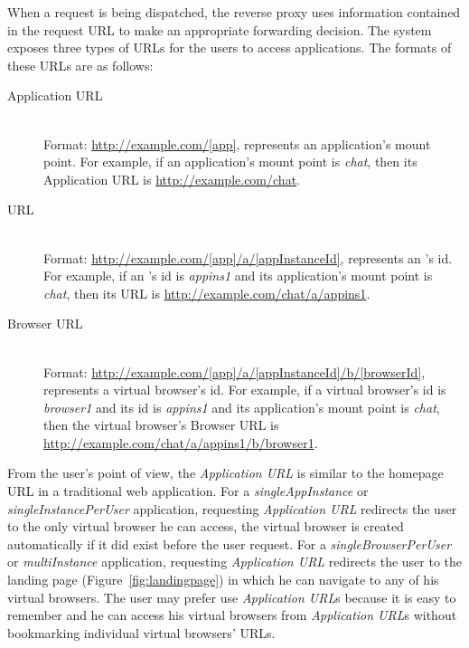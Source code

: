 When a request is being dispatched, the reverse proxy uses information
contained in the request URL to make an appropriate forwarding decision. 
The system exposes three types of URLs for the users to access \cb applications.
The formats of these URLs are as follows:

\begin{description}

\item[Application URL] \label{itm:appurl} \hfill \\
Format: \url{http://example.com/[app]}, \code{[app]} represents an
application's mount point.   For example, if an application's mount point is
\emph{chat},  then its Application URL is \url{http://example.com/chat}.


\item[\appins{} URL] \label{itm:appinsurl} \hfill \\
Format: \url{http://example.com/[app]/a/[appInstanceId]},
\code{[appInstanceId]} represents an \appins{}'s id.  For example, if an
\appins{}'s id is \emph{appins1} and its application's mount point is
\emph{chat}, then its \appins{} URL is
\url{http://example.com/chat/a/appins1}.


\item[Browser URL] \label{itm:vburl} \hfill \\
Format: \url{http://example.com/[app]/a/[appInstanceId]/b/[browserId]},
\code{[browserId]} represents a virtual browser's id. For example, if a
virtual browser's id is \emph{browser1} and its \appins{} id is 
 \emph{appins1} and its application's mount point is \emph{chat},
  then the virtual browser's
Browser URL is \url{http://example.com/chat/a/appins1/b/browser1}.

\end{description}


From the user's point of view, the \emph{Application URL} is similar to  the
homepage URL in a traditional web application. For a \emph{singleAppInstance}
or \emph{singleInstancePerUser} application, requesting \emph{Application URL}
redirects the user to the only virtual browser  he can access, the virtual
browser is created automatically if it did exist before the user request. For
a \emph{singleBrowserPerUser} or \emph{multiInstance} application, requesting
\emph{Application URL} redirects the user to the landing page
(Figure~\ref{fig:landingpage})  in which he can navigate to any of his virtual
browsers. The user may prefer use \emph{Application URL}s because it is easy
to remember and he can access his virtual browsers from \emph{Application
URL}s without bookmarking individual virtual browsers' URLs.

